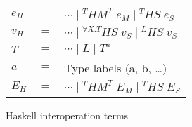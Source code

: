 \begin{figure}
\begin{center}
\begin{tabular}{lcl}
$e_{H}$ & $=$ & $\cdots\;\vert\;^{T}HM^{T}\;e_{M}\;\vert\;^{T}HS\;e_{S}$ \\
$v_{H}$ & $=$ & $\cdots\;\vert\;^{\forall X.T}HS\;v_{S}\;\vert\;^{L}HS\;v_{S}$ \\
$T$ & $=$ & $\cdots\;\vert\;L\;\vert\;T^{a}$ \\
$a$ & $=$ & Type labels (a, b, \ldots) \\
$E_{H}$ & $=$ & $\cdots\;\vert\;^{T}HM^{T}\;E_{M}\;\vert\;^{T}HS\;E_{S}$
\end{tabular}
\end{center}
\caption{Haskell interoperation terms}
\label{fig:hit}
\end{figure}